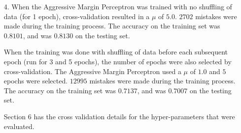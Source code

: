 \begin{enumerate}
\item[4.] When the Aggressive Margin Perceptron was trained with no shuffling of data (for 1 epoch), cross-validation resulted in a $\mu$ of $5.0$. $2702$ mistakes were made during the training process. The accuracy on the training set was $0.8101$, and was $0.8130$ on the testing set.

When the training was done with shuffling of data before each subsequent epoch (run for 3 and 5 epochs), the number of epochs were also selected by cross-validation. The Aggressive Margin Perceptron used a $\mu$ of $1.0$ and $5$ epochs were selected. $12995$ mistakes were made during the training process. The accuracy on the training set was $0.7137$, and was $0.7007$ on the testing set. 

Section 6 has the cross validation details for the hyper-parameters that were evaluated.

\end{enumerate}

